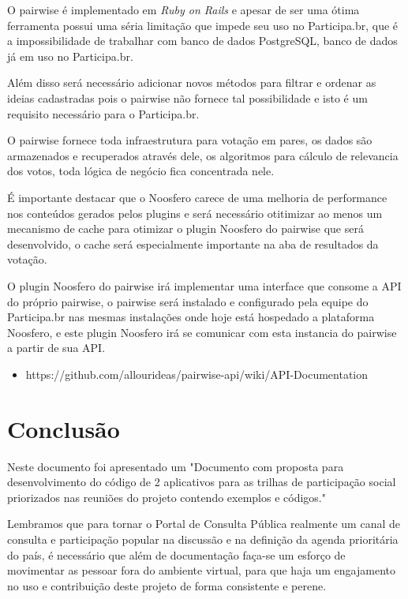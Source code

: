 \documentclass[12pt]{article}
\newcommand{\ProductDescription}{"Documento com proposta para desenvolvimento
  do código de 2 aplicativos para as trilhas de participação social
  priorizados nas reuniões do projeto contendo exemplos e códigos."
}
\begin{document}
O pairwise é implementado em {\it Ruby on Rails}\cite{wikipediaRails} e apesar
de ser uma ótima ferramenta possui uma séria limitação que impede seu uso no
Participa.br, que é a impossibilidade de trabalhar com banco de dados
PostgreSQL, banco de dados já em uso no Participa.br.

Além disso será necessário adicionar novos métodos para filtrar e ordenar as
ideias cadastradas pois o pairwise não fornece tal possibilidade e isto é um
requisito necessário para o Participa.br.


O pairwise fornece toda infraestrutura para votação em pares, os dados são
armazenados e recuperados através dele, os algoritmos para cálculo de
relevancia dos votos, toda lógica de negócio fica concentrada nele.


É importante destacar que o Noosfero carece de uma melhoria de performance nos
conteúdos gerados pelos plugins e será necessário otitimizar ao menos um
mecanismo de cache para otimizar o plugin Noosfero do pairwise que será
desenvolvido, o cache será especialmente importante na aba de resultados
da votação.

O plugin Noosfero do pairwise irá implementar uma interface que consome a API
do próprio pairwise, o pairwise será instalado e configurado pela equipe do
Participa.br nas mesmas instalações onde hoje está hospedado a plataforma
Noosfero, e este plugin Noosfero irá se comunicar com esta instancia do
pairwise a partir de sua API.

\begin{itemize}
  \item https://github.com/allourideas/pairwise-api/wiki/API-Documentation
\end{itemize}

\section{Conclusão}

Neste documento foi apresentado um \ProductDescription

Lembramos que para tornar o Portal de Consulta Pública realmente um canal de
consulta e participação popular na discussão e na definição da agenda
prioritária do país, é necessário que além de documentação faça-se um esforço
de movimentar as pessoar fora do ambiente virtual, para que haja um
engajamento no uso e contribuição deste projeto de forma consistente e perene.

\newpage

\newpage
\listoffigures
\newpage
\printindex
\newpage


%
\end{document}
